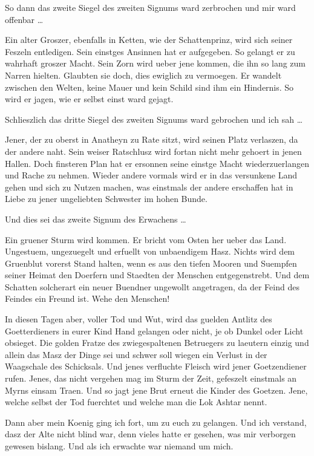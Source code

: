 \documentclass[a5paper,8pt]{book}
\begin{document}
So dann das zweite Siegel des zweiten Signums ward zerbrochen und mir ward offenbar …

Ein alter Groszer, ebenfalls in Ketten, wie der Schattenprinz, wird sich seiner Feszeln entledigen. Sein einstges Ansinnen hat er aufgegeben. So gelangt er zu wahrhaft groszer Macht. Sein Zorn wird ueber jene kommen, die ihn so lang zum Narren hielten. Glaubten sie doch, dies ewiglich zu vermoegen. Er wandelt zwischen den Welten, keine Mauer und kein Schild sind ihm ein Hindernis. So wird er jagen, wie er selbst einst ward gejagt.

Schlieszlich das dritte Siegel des zweiten Signums ward gebrochen und ich sah …

Jener, der zu oberst in Anatheyn zu Rate sitzt, wird seinen Platz verlaszen, da der andere naht. Sein weiser Ratschlusz wird fortan nicht mehr gehoert in jenen Hallen. Doch finsteren Plan hat er ersonnen seine einstge Macht wiederzuerlangen und Rache zu nehmen. Wieder andere vormals wird er in das versunkene Land gehen und sich zu Nutzen machen, was einstmals der andere erschaffen hat in Liebe zu jener ungeliebten Schwester im hohen Bunde.

Und dies sei das zweite Signum des Erwachens …

Ein gruener Sturm wird kommen. Er bricht vom Osten her ueber das Land. Ungestuem, ungezuegelt und erfuellt von unbaendigem Hasz. Nichts wird dem Gruenblut vorerst Stand halten, wenn es aus den tiefen Mooren und Suempfen seiner Heimat den Doerfern und Staedten der Menschen entgegenstrebt. Und dem Schatten solcherart ein neuer Buendner ungewollt angetragen, da der Feind des Feindes ein Freund ist. Wehe den Menschen!

In diesen Tagen aber, voller Tod und Wut, wird das guelden Antlitz des Goetterdieners in eurer Kind Hand gelangen oder nicht, je ob Dunkel oder Licht obsieget. Die golden Fratze des zwiegespaltenen Betruegers zu laeutern einzig und allein das Masz der Dinge sei und schwer soll wiegen ein Verlust in der Waagschale des Schicksals. Und jenes verfluchte Fleisch wird jener Goetzendiener rufen. Jenes, das nicht vergehen mag im Sturm der Zeit, gefeszelt einstmals an Myrns einsam Traen. Und so jagt jene Brut erneut die Kinder des Goetzen. Jene, welche selbst der Tod fuerchtet und welche man die Lok Ashtar nennt.

Dann aber mein Koenig ging ich fort, um zu euch zu gelangen. Und ich verstand, dasz der Alte nicht blind war, denn vieles hatte er gesehen, was mir verborgen gewesen bislang. Und als ich erwachte war niemand um mich.
\end{document}
